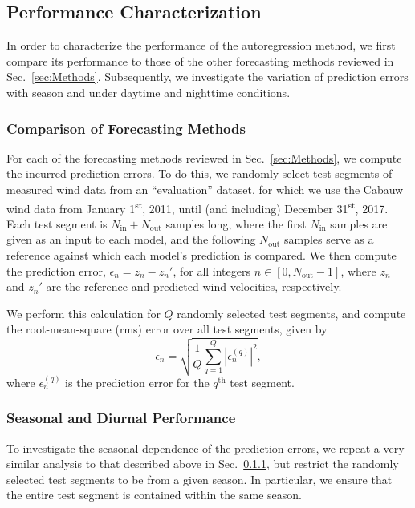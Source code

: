 \documentclass[11pt, oneside]{article}
\newcommand{\secref}[1]{Sec.~\ref{#1}}
\begin{document}
\subsection{Performance Characterization}
In order to characterize the performance of the autoregression method, we first compare its performance to those of the other forecasting methods reviewed in \secref{sec:Methods}.
Subsequently, we investigate the variation of prediction errors with season and under daytime and nighttime conditions.

\subsubsection{Comparison of Forecasting Methods}\label{sec:Methodology:Comparison}
For each of the forecasting methods reviewed in \secref{sec:Methods}, we compute the incurred prediction errors.
To do this, we randomly select test segments of measured wind data from an ``evaluation'' dataset, for which we use the Cabauw wind data from January 1\textsuperscript{st}, 2011, until (and including) December 31\textsuperscript{st}, 2017.
Each test segment is $N_\text{in} + N_\text{out}$ samples long, where the first $N_\text{in}$ samples are given as an input to each model, and the following $N_\text{out}$ samples serve as a reference against which each model's prediction is compared.
We then compute the prediction error, $\epsilon_n = z_n - z_n'$, for all integers $n \in [0,N_\text{out}-1]$, where $z_n$ and $z_n'$ are the reference and predicted wind velocities, respectively.

We perform this calculation for $Q$ randomly selected test segments, and compute the root-mean-square (rms) error over all test segments, given by
\begin{equation}\label{eq:RMSError}
\overline{\epsilon}_n = \sqrt{ \frac{1}{Q} \sum_{q = 1}^Q \left| \epsilon_n^{(q)} \right|^2 },
\end{equation}
where $\epsilon_n^{(q)}$ is the prediction error for the $q^\text{th}$ test segment.

\subsubsection{Seasonal and Diurnal Performance}\label{sec:Methodology:SeasonalAndDiurnalDependence}
To investigate the seasonal dependence of the prediction errors, we repeat a very similar analysis to that described above in \secref{sec:Methodology:Comparison}, but restrict the randomly selected test segments to be from a given season.
In particular, we ensure that the entire test segment is contained within the same season.
\end{document}

